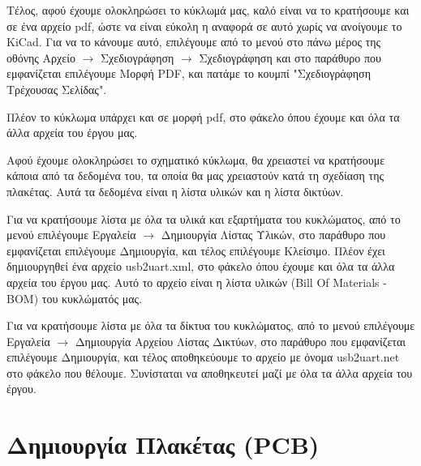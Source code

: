 \documentclass[a4paper]{article}
\begin{document}
Τέλος, αφού έχουμε ολοκληρώσει το κύκλωμά μας, καλό είναι να το κρατήσουμε και σε ένα αρχείο pdf, ώστε να είναι εύκολη η αναφορά σε αυτό χωρίς να ανοίγουμε το \textenglish{KiCad}. Για να το κάνουμε αυτό, επιλέγουμε από το μενού στο πάνω μέρος της οθόνης Αρχείο $\rightarrow$ Σχεδιογράφηση $\rightarrow$ Σχεδιογράφηση και στο παράθυρο που εμφανίζεται επιλέγουμε Μορφή PDF, και πατάμε το κουμπί "Σχεδιογράφηση Τρέχουσας Σελίδας". 

\begin{figure}
  \begin{center}
    \label{fig:kicad-main}
  \end{center}
\end{figure}

Πλέον το κύκλωμα υπάρχει και σε μορφή pdf, στο φάκελο όπου έχουμε και όλα τα άλλα αρχεία του έργου μας.


Αφού έχουμε ολοκληρώσει το σχηματικό κύκλωμα, θα χρειαστεί να κρατήσουμε κάποια από τα δεδομένα του, τα οποία θα μας χρειαστούν κατά τη σχεδίαση της πλακέτας. Αυτά τα δεδομένα είναι η λίστα υλικών και η λίστα δικτύων.

Για να κρατήσουμε λίστα με όλα τα υλικά και εξαρτήματα του κυκλώματος, από το μενού επιλέγουμε Εργαλεία $\rightarrow$ Δημιουργία Λίστας Υλικών, στο παράθυρο που εμφανίζεται επιλέγουμε Δημιουργία, και τέλος επιλέγουμε Κλείσιμο. Πλέον έχει δημιουργηθεί ένα αρχείο usb2uart.xml, στο φάκελο όπου έχουμε και όλα τα άλλα αρχεία του έργου μας. Αυτό το αρχείο είναι η λίστα υλικών (Bill Of Materials - BOM) του κυκλώματός μας.

Για να κρατήσουμε λίστα με όλα τα δίκτυα του κυκλώματος, από το μενού επιλέγουμε Εργαλεία $\rightarrow$ Δημιουργία Αρχείου Λίστας Δικτύων, στο παράθυρο που εμφανίζεται επιλέγουμε Δημιουργία, και τέλος αποθηκεύουμε το αρχείο με όνομα usb2uart.net στο φάκελο που θέλουμε. Συνίσταται να αποθηκευτεί μαζί με όλα τα άλλα αρχεία του έργου.




\section{Δημιουργία Πλακέτας (PCB)}
\end{document}
